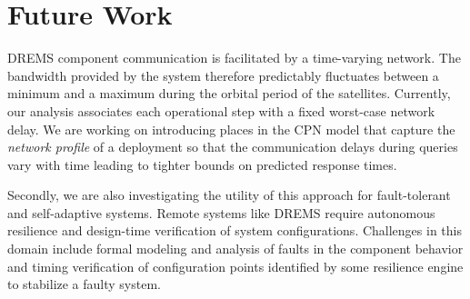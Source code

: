 \section{Future Work}
\label{sec:Future_Work}

DREMS component communication is facilitated by a time-varying network. The bandwidth provided by the system therefore predictably fluctuates between a minimum and a maximum during the orbital period of the satellites. Currently, our analysis associates each operational step with a fixed worst-case network delay. We are working on introducing places in the CPN model that capture the \emph{network profile} of a deployment so that the communication delays during queries vary with time leading to tighter bounds on predicted response times. 

Secondly, we are also investigating the utility of this approach for fault-tolerant and self-adaptive systems. Remote systems like DREMS require autonomous resilience and design-time verification of system configurations. Challenges in this domain include formal modeling and analysis of faults in the component behavior and timing verification of configuration points identified by some resilience engine to stabilize a faulty system. 